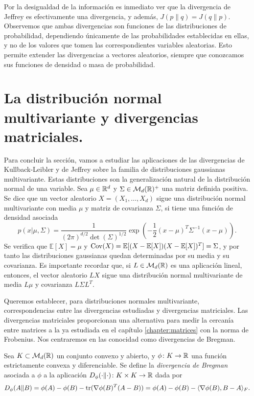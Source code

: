 Por la desigualdad de la información es inmediato ver que la divergencia de Jeffrey es efectivamente una divergencia, y además, $J(p\|q) = J(q\|p)$. Observemos que ambas divergencias son funciones de las distribuciones de probabilidad, dependiendo únicamente de las probabilidades establecidas en ellas, y no de los valores que tomen las correspondientes variables aleatorias. Esto permite extender las divergencias a vectores aleatorios, siempre que conozcamos sus funciones de densidad o masa de probabilidad.

\section{La distribución normal multivariante y divergencias matriciales.}

Para concluir la sección, vamos a estudiar las aplicaciones de las divergencias de Kullback-Leibler y de Jeffrey sobre la familia de distribuciones gaussianas multivariante. Estas distribuciones son la generalización natural de la distribución normal de una variable. Sea $\mu \in \mathbb{R}^d$ y $\Sigma \in \mathcal{M}_d(\mathbb{R})^+$ una matriz definida positiva. Se dice que un vector aleatorio $X = (X_1,\dots,X_d)$ sigue una distribución normal multivariante con media $\mu$ y matriz de covarianza $\Sigma$, si tiene una función de densidad asociada
\[ p(x|\mu,\Sigma) = \frac{1}{(2\pi)^{d/2} \det(\Sigma)^{1/2}} \exp\left(-\frac{1}{2} (x-\mu)^T\Sigma^{-1}(x-\mu)\right). \]
Se verifica que $\mathbb{E}[X] = \mu$ y $\operatorname{Cov}(X) = \mathbb{E}[(X-\mathbb{E}[X])(X - \mathbb{E}[X])^T] = \Sigma$, y por tanto las distribuciones gaussianas quedan determinadas por su media y su covarianza. Es importante recordar que, si $L \in \mathcal{M}_d(\mathbb{R})$ es una aplicación lineal, entonces, el vector aleatorio $LX$ sigue una distribución normal multivariante de media $L\mu$ y covarianza $L\Sigma L^T$.

Queremos establecer, para distribuciones normales multivariante, correspondencias entre las divergencias estudiadas y divergencias matriciales. Las divergencias matriciales proporcionan una alternativa para medir la cercanía entre matrices a la ya estudiada en el capítulo \ref{chapter:matrices} con la norma de Frobenius. Nos centraremos en las conocidad como divergencias de Bregman.

\begin{definition}
    Sea $K \subset \mathcal{M}_d(\mathbb{R})$ un conjunto convexo y abierto, y $\phi \colon K \to \mathbb{R}$ una función estrictamente convexa y diferenciable. Se define la \emph{divergencia de Bregman} asociada a $\phi$ a la aplicación $D_{\phi}(\cdot \| \cdot) \colon K \times K \to \mathbb{R}$ dada por
    \[ D_{\phi}(A\|B) = \phi(A) - \phi(B) - \operatorname{tr}(\nabla\phi(B)^T(A-B)) = \phi(A) - \phi(B) - \langle \nabla\phi(B), B-A\rangle_F.\]
\end{definition}

